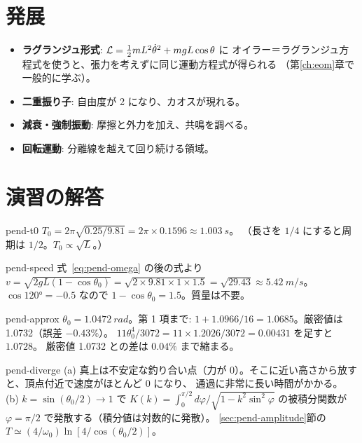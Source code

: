 \section{発展}\label{sec:pend-advanced}
\begin{itemize}
  \item \textbf{ラグランジュ形式}: $\mathcal{L}=\tfrac12mL^2\dot\theta^2+mgL\cos\theta$ に
    オイラー＝ラグランジュ方程式を使うと、張力を考えずに同じ運動方程式が得られる
    （第\ref{ch:eom}章で一般的に学ぶ）。
  \item \textbf{二重振り子}: 自由度が 2 になり、カオスが現れる。
  \item \textbf{減衰・強制振動}: 摩擦と外力を加え、共鳴を調べる。
  \item \textbf{回転運動}: 分離線を越えて回り続ける領域。
\end{itemize}

\section{演習の解答}\label{sec:pend-solutions}

\begin{solution}{pend-t0}
$T_0=2\pi\sqrt{0.25/9.81}=2\pi\times0.1596\approx\qty{1.003}{s}$。
（長さを $1/4$ にすると周期は $1/2$。$T_0\propto\sqrt L$。）
\end{solution}

\begin{solution}{pend-speed}
式~\eqref{eq:pend-omega} の後の式より
$v=\sqrt{2gL(1-\cos\theta_0)}=\sqrt{2\times9.81\times1\times1.5}=\sqrt{29.43}\approx\qty{5.42}{m/s}$。
$\cos\ang{120}=-0.5$ なので $1-\cos\theta_0=1.5$。質量は不要。
\end{solution}

\begin{solution}{pend-approx}
$\theta_0=\qty{1.0472}{rad}$。第 1 項まで: $1+1.0966/16=1.0685$。厳密値は 1.0732（誤差 $-0.43\%$）。
$11\theta_0^4/3072=11\times1.2026/3072=0.00431$ を足すと $1.0728$。
厳密値 1.0732 との差は $0.04\%$ まで縮まる。
\end{solution}

\begin{solution}{pend-diverge}
(a) 真上は不安定な釣り合い点（力が 0）。そこに近い高さから放すと、頂点付近で速度がほとんど 0 になり、
通過に非常に長い時間がかかる。
(b) $k=\sin(\theta_0/2)\to1$ で $K(k)=\int_0^{\pi/2}d\varphi/\sqrt{1-k^2\sin^2\varphi}$ の被積分関数が
$\varphi=\pi/2$ で発散する（積分値は対数的に発散）。
\ref{sec:pend-amplitude}節の $T\simeq(4/\omega_0)\ln[4/\cos(\theta_0/2)]$。
\end{solution}


